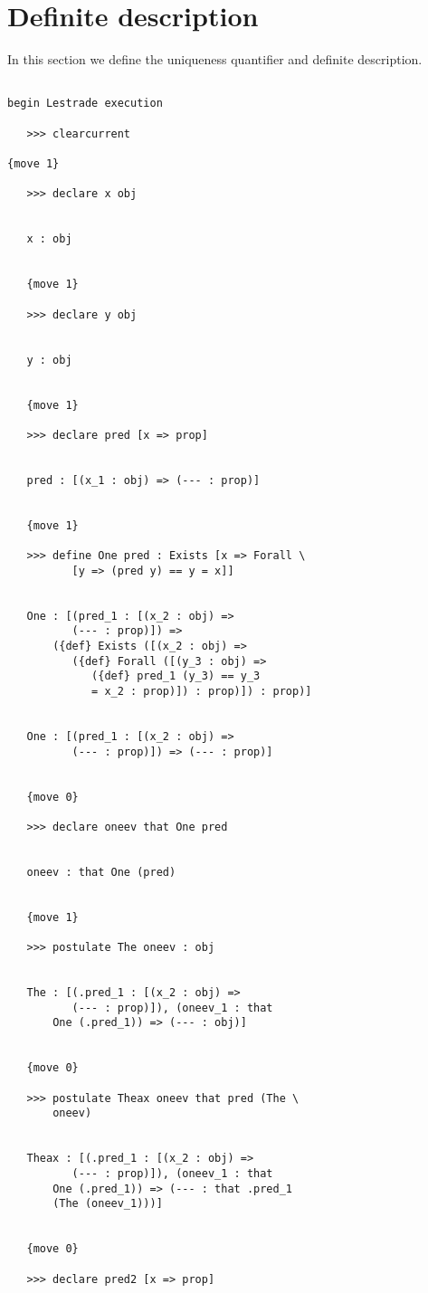 \documentclass[12pt]{article}
\begin{document}
\section{Definite description}

In this section we define the uniqueness quantifier and definite description.

\begin{verbatim}

begin Lestrade execution

   >>> clearcurrent

{move 1}

   >>> declare x obj


   x : obj


   {move 1}

   >>> declare y obj


   y : obj


   {move 1}

   >>> declare pred [x => prop]


   pred : [(x_1 : obj) => (--- : prop)]


   {move 1}

   >>> define One pred : Exists [x => Forall \
          [y => (pred y) == y = x]]


   One : [(pred_1 : [(x_2 : obj) => 
          (--- : prop)]) => 
       ({def} Exists ([(x_2 : obj) => 
          ({def} Forall ([(y_3 : obj) => 
             ({def} pred_1 (y_3) == y_3 
             = x_2 : prop)]) : prop)]) : prop)]


   One : [(pred_1 : [(x_2 : obj) => 
          (--- : prop)]) => (--- : prop)]


   {move 0}

   >>> declare oneev that One pred


   oneev : that One (pred)


   {move 1}

   >>> postulate The oneev : obj


   The : [(.pred_1 : [(x_2 : obj) => 
          (--- : prop)]), (oneev_1 : that 
       One (.pred_1)) => (--- : obj)]


   {move 0}

   >>> postulate Theax oneev that pred (The \
       oneev)


   Theax : [(.pred_1 : [(x_2 : obj) => 
          (--- : prop)]), (oneev_1 : that 
       One (.pred_1)) => (--- : that .pred_1 
       (The (oneev_1)))]


   {move 0}

   >>> declare pred2 [x => prop]



\end{verbatim}
\end{document}
